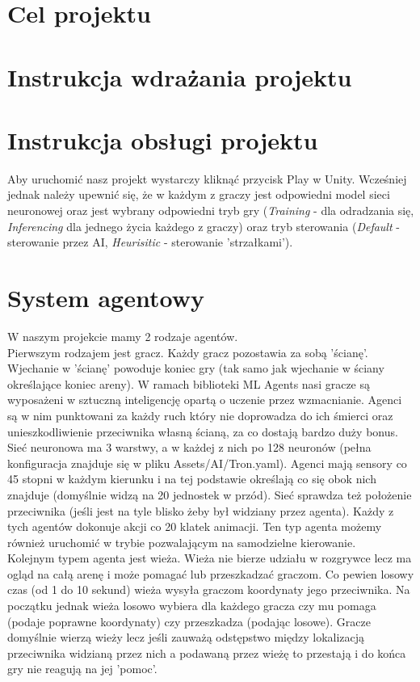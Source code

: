 \documentclass[12pt,a4paper]{article}
\begin{document}
\section{Cel projektu}

\section{Instrukcja wdrażania projektu}

\section{Instrukcja obsługi projektu}
Aby uruchomić nasz projekt wystarczy kliknąć przycisk Play w Unity. Wcześniej jednak należy upewnić się, że w każdym z graczy jest odpowiedni model sieci neuronowej oraz jest wybrany odpowiedni tryb gry (\textit{Training} - dla odradzania się, \textit{Inferencing} dla jednego życia każdego z graczy) oraz tryb sterowania (\textit{Default} - sterowanie przez AI, \textit{Heurisitic} - sterowanie 'strzałkami').

\section{System agentowy}
W naszym projekcie mamy 2 rodzaje agentów.\\
Pierwszym rodzajem jest gracz. Każdy gracz pozostawia za sobą 'ścianę'. Wjechanie w 'ścianę' powoduje koniec gry (tak samo jak wjechanie w ściany określające koniec areny). W ramach biblioteki ML Agents nasi gracze są wyposażeni w sztuczną inteligencję opartą o uczenie przez wzmacnianie. Agenci są w nim punktowani za każdy ruch który nie doprowadza do ich śmierci oraz unieszkodliwienie przeciwnika własną ścianą, za co dostają bardzo duży bonus. Sieć neuronowa ma 3 warstwy, a w każdej z nich po 128 neuronów (pełna konfiguracja znajduje się w pliku Assets/AI/Tron.yaml). Agenci mają sensory co 45 stopni w każdym kierunku i na tej podstawie określają co się obok nich znajduje (domyślnie widzą na 20 jednostek w przód). Sieć sprawdza też położenie przeciwnika (jeśli jest na tyle blisko żeby był widziany przez agenta). Każdy z tych agentów dokonuje akcji co 20 klatek animacji. Ten typ agenta możemy również uruchomić w trybie pozwalającym na samodzielne kierowanie.\\
Kolejnym typem agenta jest wieża. Wieża nie bierze udziału w rozgrywce lecz ma ogląd na całą arenę i może pomagać lub przeszkadzać graczom. Co pewien losowy czas (od 1 do 10 sekund) wieża wysyła graczom koordynaty jego przeciwnika. Na początku jednak wieża losowo wybiera dla każdego gracza czy mu pomaga (podaje poprawne koordynaty) czy przeszkadza (podając losowe). Gracze domyślnie wierzą wieży lecz jeśli zauważą odstępstwo między lokalizacją przeciwnika widzianą przez nich a podawaną przez wieżę to przestają i do końca gry nie reagują na jej 'pomoc'.
\end{document}
